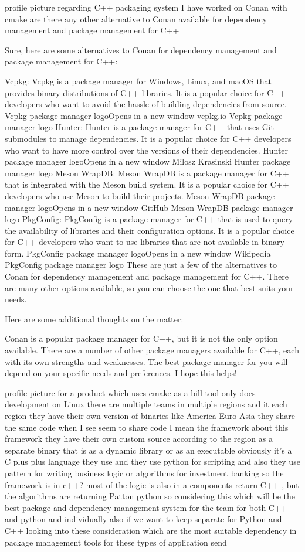\documentclass[11pt]{article}
\begin{document}
profile picture
regarding C++ packaging system
I have worked on Conan
with cmake
are there any other alternative to Conan available
for dependency management and package management
for C++

Sure, here are some alternatives to Conan for dependency management and package management for C++:

Vcpkg: Vcpkg is a package manager for Windows, Linux, and macOS that provides binary distributions of C++ libraries. It is a popular choice for C++ developers who want to avoid the hassle of building dependencies from source.
Vcpkg package manager logoOpens in a new window
vcpkg.io
Vcpkg package manager logo
Hunter: Hunter is a package manager for C++ that uses Git submodules to manage dependencies. It is a popular choice for C++ developers who want to have more control over the versions of their dependencies.
Hunter package manager logoOpens in a new window
Milosz Krasinski
Hunter package manager logo
Meson WrapDB: Meson WrapDB is a package manager for C++ that is integrated with the Meson build system. It is a popular choice for C++ developers who use Meson to build their projects.
Meson WrapDB package manager logoOpens in a new window
GitHub
Meson WrapDB package manager logo
PkgConfig: PkgConfig is a package manager for C++ that is used to query the availability of libraries and their configuration options. It is a popular choice for C++ developers who want to use libraries that are not available in binary form.
PkgConfig package manager logoOpens in a new window
Wikipedia
PkgConfig package manager logo
These are just a few of the alternatives to Conan for dependency management and package management for C++. There are many other options available, so you can choose the one that best suits your needs.

Here are some additional thoughts on the matter:

Conan is a popular package manager for C++, but it is not the only option available.
There are a number of other package managers available for C++, each with its own strengths and weaknesses.
The best package manager for you will depend on your specific needs and preferences.
I hope this helps!

profile picture
for a product
which uses cmake as a bill
tool
only does development on
Linux
there are
multiple teams in multiple regions
and it each region they have their own
version of
binaries
like America
Euro
Asia
they share the same code
when I see seem to share code I mean the framework
about this framework
they have their own custom source according to the region
as a separate
binary that is as a dynamic library or as an executable
obviously it's a C plus plus
language they use
and they use
python
for scripting
and also they use pattern
for writing
business logic or algorithms for
investment banking
so the framework is in c++?
most of the logic is also in a
components return C++
, but
the algorithms are returning
Patton
python
so considering this
which will be the best
package and dependency management
system
for the team
for both C++ and python
and individually also
if we want to keep
separate for Python and C++
looking into these consideration which are the
most suitable
dependency in package management
tools for
these types of application send
\end{document}
